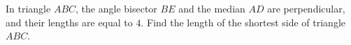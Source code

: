 In triangle $ABC$, the angle bisector $BE$ and the median $AD$ are perpendicular, and their lengths are equal to $4$. Find the length of the shortest side of triangle $ABC$.
